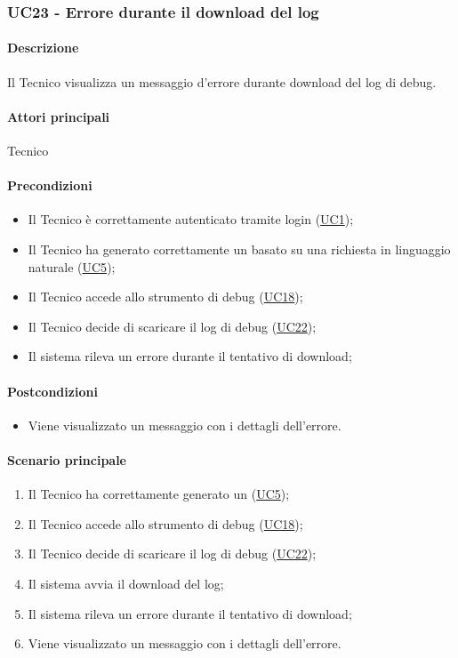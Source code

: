 \subsubsection{UC23 - Errore durante il download del log}\label{UC23}
\paragraph*{Descrizione}
Il Tecnico visualizza un messaggio d'errore durante download del log di debug.

\paragraph*{Attori principali}
Tecnico

\paragraph*{Precondizioni}
\begin{itemize}
  \item Il Tecnico è correttamente autenticato tramite login (\hyperref[UC1]{UC1});
  \item Il Tecnico ha generato correttamente un  basato su una richiesta in linguaggio naturale (\hyperref[UC5]{UC5});
  \item Il Tecnico accede allo strumento di debug (\hyperref[UC18]{UC18});
  \item Il Tecnico decide di scaricare il log di debug (\hyperref[UC22]{UC22});
  \item Il sistema rileva un errore durante il tentativo di download;
\end{itemize}

\paragraph*{Postcondizioni}
\begin{itemize}
  \item Viene visualizzato un messaggio con i dettagli dell'errore.
\end{itemize}

\paragraph*{Scenario principale}
\begin{enumerate}
  \item Il Tecnico ha correttamente generato un  (\hyperref[UC5]{UC5});
  \item Il Tecnico accede allo strumento di debug (\hyperref[UC18]{UC18});
  \item Il Tecnico decide di scaricare il log di debug (\hyperref[UC22]{UC22});
  \item Il sistema avvia il download del log;
  \item Il sistema rileva un errore durante il tentativo di download;
  \item Viene visualizzato un messaggio con i dettagli dell'errore.
\end{enumerate}